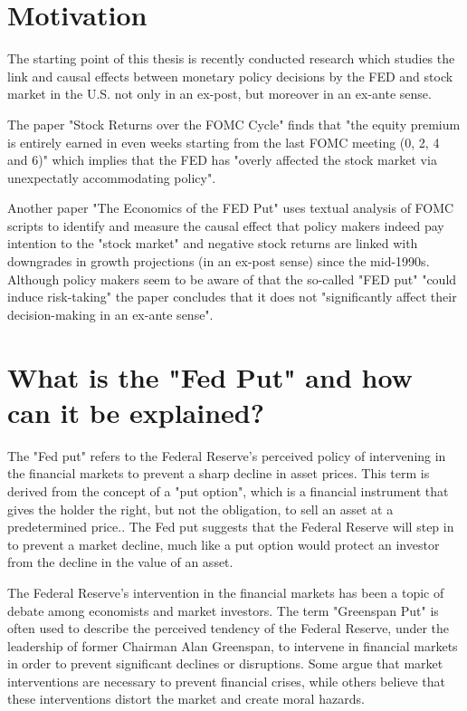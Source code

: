 
\chapter{Motivation}

The starting point of this thesis is recently conducted research which studies the link and causal effects between monetary policy decisions by the FED and stock market in the U.S.  not only in an ex-post,  but moreover in an ex-ante sense.

The paper "Stock Returns over the FOMC Cycle" \parencite{Cie19} finds that "the equity premium is entirely earned in even weeks starting from the last FOMC meeting (0,  2,  4 and 6)" which implies that the FED has "overly affected the stock market via unexpectatly accommodating policy". 

Another paper "The Economics of the FED Put"  \parencite{Cie21} uses textual analysis of FOMC scripts to identify and measure the causal effect that policy makers indeed pay intention to the "stock market" and negative stock returns are linked with downgrades in growth projections (in an ex-post sense) since the mid-1990s.  
Although policy makers seem to be aware of that the so-called "FED put" "could induce risk-taking" the paper concludes that it does not "significantly affect their decision-making in an ex-ante sense".


\chapter{What is the "Fed Put" and how can it be explained?}

The "Fed put" refers to the Federal Reserve's perceived policy of intervening in the financial markets to prevent a sharp decline in asset prices.  \parencite{WSJ7}
This term is derived from the concept of a "put option",  which is a financial instrument that gives the holder the right, but not the obligation,  to sell an asset at a predetermined price..
The Fed put suggests that the Federal Reserve will step in to prevent a market decline,  much like a put option would protect an investor from the decline in the value of an asset. 

The Federal Reserve's intervention in the financial markets has been a topic of debate among economists and market investors. 
The term "Greenspan Put" is often used to describe the perceived tendency of the Federal Reserve,  under the leadership of former Chairman Alan Greenspan,  to intervene in financial markets in order to prevent significant declines or disruptions. 
Some argue that market interventions are necessary to prevent financial crises,  while others believe that these interventions distort the market and create moral hazards.  \parencite{Cie21}


